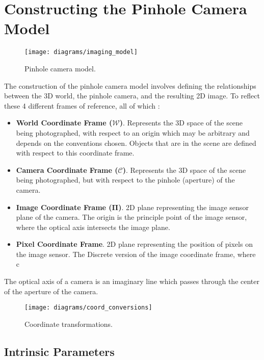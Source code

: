\section{Constructing the Pinhole Camera Model}

\begin{figure}[H]
    \centering
    \texttt{[image: diagrams/imaging\_model]}
    \caption{Pinhole camera model.}
\end{figure}

The construction of the pinhole camera model involves defining the relationships between the 3D world, the pinhole camera, and the resulting 2D image. To reflect these  4 different frames of reference, all of which :
\begin{itemize}[leftmargin=!, itemindent=-4ex]
    \item\textbf{World Coordinate Frame ($\boldsymbol{\mathcal{W}}$)}. Represents the 3D space of the scene being photographed, with respect to an origin which may be arbitrary and depends on the conventions chosen. Objects that are in the scene are defined with respect to this coordinate frame.
    \item\textbf{Camera Coordinate Frame ($\boldsymbol{\mathcal{C}}$)}. Represents the 3D space of the scene being photographed, but with respect to the pinhole (aperture) of the camera.
    \item\textbf{Image Coordinate Frame ($\boldsymbol{\Pi}$)}. 2D plane representing the image sensor plane of the camera. The origin is the principle point of the image sensor, where the optical axis intersects the image plane.
    \item\textbf{Pixel Coordinate Frame}. 2D plane representing the position of pixels on the image sensor. The Discrete version of the image coordinate frame, where c
\end{itemize}

The optical axis of a camera is an imaginary line which passes through the center of the aperture of the camera.



\begin{figure}[H]
    \centering
    \texttt{[image: diagrams/coord\_conversions]}
    \caption{Coordinate transformations.}
\end{figure}


\subsection{Intrinsic Parameters} \label{sec:intrinsics}

